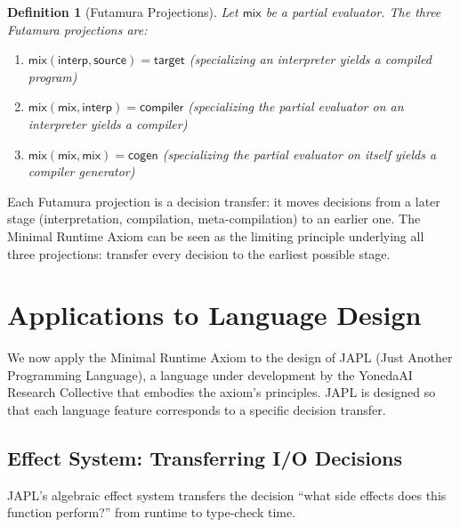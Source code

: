 \documentclass[11pt]{article}
\newtheorem{definition}[theorem]{Definition}
\begin{document}
\begin{definition}[Futamura Projections]
\label{def:futamura}
Let $\mathsf{mix}$ be a partial evaluator. The three Futamura projections are:
\begin{enumerate}[nosep]
  \item $\mathsf{mix}(\mathsf{interp}, \mathsf{source}) = \mathsf{target}$
    \quad(specializing an interpreter yields a compiled program)
  \item $\mathsf{mix}(\mathsf{mix}, \mathsf{interp}) = \mathsf{compiler}$
    \quad(specializing the partial evaluator on an interpreter yields a compiler)
  \item $\mathsf{mix}(\mathsf{mix}, \mathsf{mix}) = \mathsf{cogen}$
    \quad(specializing the partial evaluator on itself yields a compiler generator)
\end{enumerate}
\end{definition}

Each Futamura projection is a decision transfer: it moves decisions from a later stage
(interpretation, compilation, meta-compilation) to an earlier one. The Minimal Runtime
Axiom can be seen as the limiting principle underlying all three projections: transfer
every decision to the earliest possible stage.


\section{Applications to Language Design}
\label{sec:language-design}

We now apply the Minimal Runtime Axiom to the design of JAPL (Just Another Programming
Language), a language under development by the YonedaAI Research Collective that
embodies the axiom's principles. JAPL is designed so that each language feature
corresponds to a specific decision transfer.

\subsection{Effect System: Transferring I/O Decisions}

JAPL's algebraic effect system transfers the decision ``what side effects does this
function perform?'' from runtime to type-check time.
\end{document}
